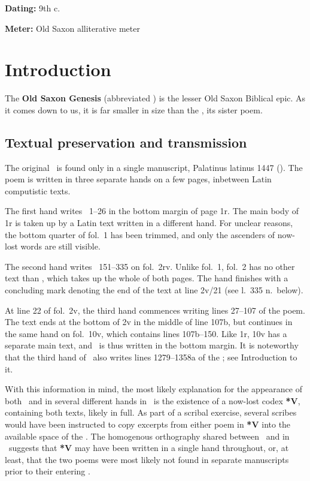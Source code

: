 
\begin{flushright}%
\textbf{Dating:} 9th c.

\textbf{Meter:} Old Saxon alliterative meter
\end{flushright}%

\section{Introduction}

The \textbf{Old Saxon Genesis} (abbreviated \SaxonGenesis) is the lesser Old Saxon Biblical epic.  As it comes down to us, it is far smaller in size than the , its sister poem.

\subsection{Textual preservation and transmission}

The original \SaxonGenesis\ is found only in a single manuscript, Palatinus latinus 1447 (\Vaticanus).  The poem is written in three separate hands on a few pages, inbetween Latin computistic texts.%

The first hand writes \SaxonGenesis\ 1--26 in the bottom margin of page 1r.  The main body of 1r is taken up by a Latin text written in a different hand.  For unclear reasons, the bottom quarter of fol.~1 has been trimmed, and only the ascenders of now-lost words are still visible.

The second hand writes \SaxonGenesis\ 151--335 on fol.~2rv.  Unlike fol.~1, fol.~2 has no other text than \SaxonGenesis, which takes up the whole of both pages.  The hand finishes with a concluding mark denoting the end of the text at line 2v/21 (see l.~335 n.~below).

At line 22 of fol.~2v, the third hand commences writing lines 27--107 of the poem.  The text ends at the bottom of 2v in the middle of line 107b, but continues in the same hand on fol.~10v, which contains lines 107b--150.  Like 1r, 10v has a separate main text, and \SaxonGenesis\ is thus written in the bottom margin.  It is noteworthy that the third hand of \SaxonGenesis\ also writes lines 1279--1358a of the ; see Introduction to it.

With this information in mind, the most likely explanation for the appearance of both \SaxonGenesis\ and  in several different hands in \Vaticanus\ is the existence of a now-lost codex \textup{\textbf{*V}}, containing both texts, likely in full.  As part of a scribal exercise, several scribes would have been instructed to copy excerpts from either poem in \textup{\textbf{*V}} into the available space of the \Vaticanus.  The homogenous orthography shared between \SaxonGenesis\ and  in \Vaticanus\ suggests that \textup{\textbf{*V}} may have been written in a single hand throughout, or, at least, that the two poems were most likely not found in separate manuscripts prior to their entering \Vaticanus.

